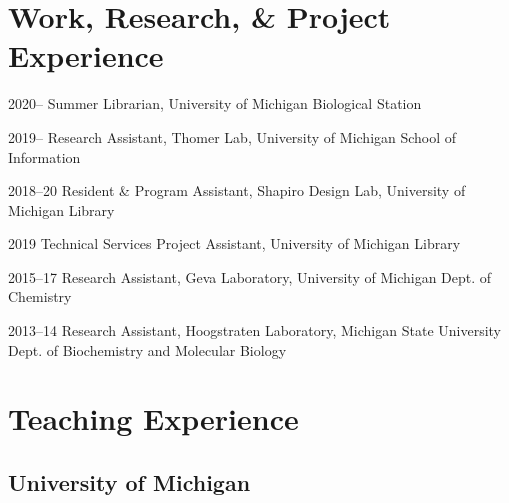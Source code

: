 \documentclass[12pt,letterpaper]{report}
\begin{document}
\section*{Work, Research, \& Project Experience}

\begin{tablist}
    
	\item[2020--] \tab Summer Librarian, University of Michigan Biological Station
    
	\item[2019--] \tab Research Assistant, Thomer Lab, University of Michigan School of Information
        
	\item[2018--20] \tab Resident \& Program Assistant, Shapiro Design Lab, University of Michigan Library
    
	\item[2019] \tab Technical Services Project Assistant, University of Michigan Library

	\item[2015--17] \tab Research Assistant, Geva Laboratory, University of Michigan Dept. of Chemistry
	
	\item[2013--14] \tab Research Assistant, Hoogstraten Laboratory, Michigan State University Dept. of Biochemistry and Molecular Biology

\end{tablist}



\section*{Teaching Experience}

\subsection*{University of Michigan}
    
\end{document}
